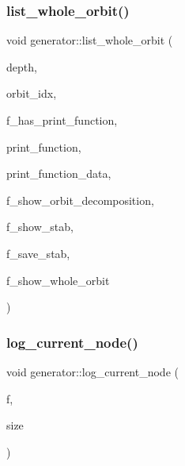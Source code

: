 \mbox{\label{classgenerator_aa102d1c1e32f0cd1dafeab1e0d1c18c1}} 
\subsubsection{\texorpdfstring{list\+\_\+whole\+\_\+orbit()}{list\_whole\_orbit()}}
{\footnotesize\ttfamily void generator\+::list\+\_\+whole\+\_\+orbit (\begin{DoxyParamCaption}\item[{\mbox{\hyperlink{galois_8h_a09fddde158a3a20bd2dcadb609de11dc}{I\+NT}}}]{depth,  }\item[{\mbox{\hyperlink{galois_8h_a09fddde158a3a20bd2dcadb609de11dc}{I\+NT}}}]{orbit\+\_\+idx,  }\item[{\mbox{\hyperlink{galois_8h_a09fddde158a3a20bd2dcadb609de11dc}{I\+NT}}}]{f\+\_\+has\+\_\+print\+\_\+function,  }\item[{void($\ast$)(\mbox{\hyperlink{galois_8h_a09fddde158a3a20bd2dcadb609de11dc}{I\+NT}} len, \mbox{\hyperlink{galois_8h_a09fddde158a3a20bd2dcadb609de11dc}{I\+NT}} $\ast$\mbox{\hyperlink{classgenerator_a5d2b65e2bd0e451744af1a47ba00bd96}{S}}, void $\ast$data)}]{print\+\_\+function,  }\item[{void $\ast$}]{print\+\_\+function\+\_\+data,  }\item[{\mbox{\hyperlink{galois_8h_a09fddde158a3a20bd2dcadb609de11dc}{I\+NT}}}]{f\+\_\+show\+\_\+orbit\+\_\+decomposition,  }\item[{\mbox{\hyperlink{galois_8h_a09fddde158a3a20bd2dcadb609de11dc}{I\+NT}}}]{f\+\_\+show\+\_\+stab,  }\item[{\mbox{\hyperlink{galois_8h_a09fddde158a3a20bd2dcadb609de11dc}{I\+NT}}}]{f\+\_\+save\+\_\+stab,  }\item[{\mbox{\hyperlink{galois_8h_a09fddde158a3a20bd2dcadb609de11dc}{I\+NT}}}]{f\+\_\+show\+\_\+whole\+\_\+orbit }\end{DoxyParamCaption})}

\mbox{\label{classgenerator_a4fd0437e36f15926e172ff8a296d33a5}} 
\subsubsection{\texorpdfstring{log\+\_\+current\+\_\+node()}{log\_current\_node()}}
{\footnotesize\ttfamily void generator\+::log\+\_\+current\+\_\+node (\begin{DoxyParamCaption}\item[{ostream \&}]{f,  }\item[{\mbox{\hyperlink{galois_8h_a09fddde158a3a20bd2dcadb609de11dc}{I\+NT}}}]{size }\end{DoxyParamCaption})}


